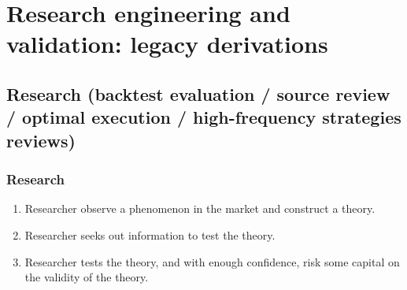 \documentclass[a4paper,oneside,openany]{book}
\begin{document}
\chapter*{Research engineering and validation: legacy derivations}

\section*{Research (backtest evaluation / source review / optimal execution / high-frequency strategies reviews)}

\subsection*{Research}

\begin{definition} 
\begin{enumerate}[label=\arabic*.]
\setlength{\itemsep}{0pt}
\item Researcher observe a phenomenon in the market and construct a theory.
\item Researcher seeks out information to test the theory.
\item Researcher tests the theory, and with enough confidence, risk some capital on the validity of the theory.
\end{enumerate}
\end{definition}
\end{document}
